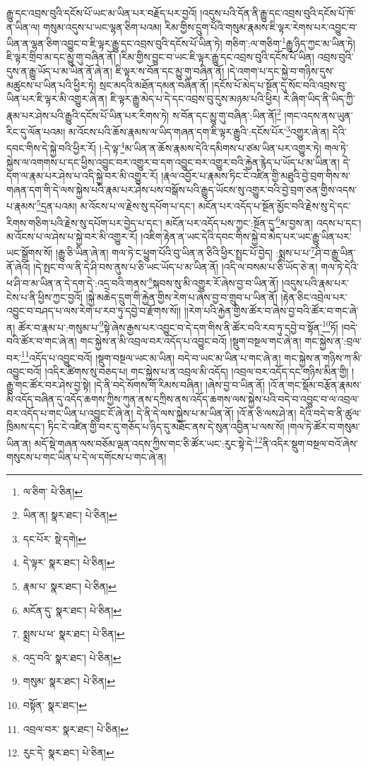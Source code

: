 རྒྱུ་དང་འབྲས་བུའི་དངོས་པོ་ཡང་མ་ཡིན་པར་བརྗོད་པར་བྱའོ། །འདུས་པའི་དོན་ནི་རྒྱུ་དང་འབྲས་བུའི་དངོས་པོ་ཁོ་ན་ཡིན་ལ། གསུམ་འདུས་པ་ཡང་ལྷན་ཅིག་པའམ། རིམ་གྱིས་དྲུག་པོའི་གསུམ་རྣམས་ཇི་ལྟར་རེགས་པར་འབྱུང་བ་ཡིན་ན་ལྷན་ཅིག་འབྱུང་བ་ཇི་ལྟར་རྒྱུ་དང་འབྲས་བུའི་དངོས་པོ་ཡིན་ཏེ། གཅིག་:ལ་གཅིག་\footnote{ལ་ཅིག་  པེ་ཅིན། }རྒྱུ་ཉིད་ཀྱང་མ་ཡིན་ཏེ། ཇི་ལྟར་གྲིབ་མ་དང་མྱུ་གུ་བཞིན་ནོ། །རིམ་གྱིས་བྱུང་བ་ཡང་ཇི་ལྟར་རྒྱུ་དང་འབྲས་བུའི་དངོས་པོ་ཡིན། འབྲས་བུའི་དུས་ན་རྒྱུ་ཡོད་པ་མ་ཡིན་ནོ་ཞེ་ན། ཇི་ལྟར་ས་བོན་དང་མྱུ་གུ་བཞིན་ནོ། །དེ་འགག་པ་དང་སྐྱེ་བ་གཉིས་དུས་མཚུངས་པ་ཡིན་པའི་ཕྱིར་ཏེ། སྲང་མདའི་མཐོན་དམན་བཞིན་ནོ། །དངོས་པོ་མེད་པ་སྔོན་དུ་སོང་བའི་འབྲས་བུ་ཡིན་པར་ཇི་ལྟར་མི་འགྱུར་ཞེ་ན། ཇི་ལྟར་རྒྱུ་མེད་པ་དེ་དང་འབྲས་བུ་དུས་མཉམ་པའི་ཕྱིར། རེ་ཞིག་ཡིད་ནི་ཡིད་ཀྱི་རྣམ་པར་ཤེས་པའི་རྒྱུའི་དངོས་པོ་ཡིན་པར་རིགས་ཏེ། ས་བོན་དང་མྱུ་གུ་བཞིན་:ཡིན་ནོ།\footnote{ཡིན་ན།  སྣར་ཐང་།  པེ་ཅིན། } །གང་འདས་ནས་ཡུན་རིང་དུ་ལོན་པའམ། མ་འོངས་པའི་ཆོས་རྣམས་ལ་ཡིད་གཞན་དག་ཇི་ལྟར་རྒྱུའི་:དངོས་པོར་\footnote{དང་པོར་  སྡེ་དགེ། }འགྱུར་ཞེ་ན། དེའི་དབང་གིས་དེ་སྐྱེ་བའི་ཕྱིར་རོ། །:དེ་ལྟ་\footnote{དེ་ལྟར་  སྣར་ཐང་།  པེ་ཅིན། }མ་ཡིན་ན་ཆོས་རྣམས་དེའི་དམིགས་པ་ཙམ་ཡིན་པར་འགྱུར་ཏེ། གལ་ཏེ་སྐྱེས་ལ་འགགས་པ་དང་ཕྱིས་འབྱུང་བར་འགྱུར་བ་དག་འབྱུང་བར་འགྱུར་བའི་རྐྱེན་རྙེད་པ་ཡོད་པ་མ་ཡིན་ན། དེ་དག་ལ་རྣམ་པར་ཤེས་པ་འདི་སྐྱེ་བར་མི་འགྱུར་རོ། །རྣལ་འབྱོར་པ་རྣམས་ཏིང་ངེ་འཛིན་གྱི་མཐུའི་བྱེ་བྲག་གིས་ས་གཞན་དག་གི་དེ་ལས་སྐྱེས་པའི་རྣམ་པར་ཤེས་པས་བསྒོས་པའི་རྒྱུད་ཡོངས་སུ་འགྱུར་བའི་བྱེ་བྲག་ཅན་གྱིས་འདས་པ་རྣམས་\footnote{རྣམ་པ་  སྣར་ཐང་།  པེ་ཅིན། }དྲན་པའམ། མ་འོངས་པ་ལ་རྗེས་སུ་དཔོག་པ་དང་། མངོན་པར་འདོད་པ་སྔོན་མྱོང་བའི་རྗེས་སུ་དེ་དང་རིགས་གཅིག་པའི་རྗེས་སུ་དཔོག་པར་བྱེད་པ་དང་། མངོན་པར་འདོད་པས་ཀྱང་:སྔོན་དུ་\footnote{མངོན་དུ་  སྣར་ཐང་།  པེ་ཅིན། }མ་བྱས་ན། འདས་པ་དང་། མ་འོངས་པ་ལ་ཤེས་པ་སྐྱེ་བར་མི་འགྱུར་རོ། །འཇིག་རྟེན་ན་ཡང་དེའི་དབང་གིས་སྐྱེ་བ་མེད་པར་ཡང་རྒྱུ་ཡིན་པར་ཡང་སྒྲོགས་སོ། །རྒྱུ་ཅི་ཡིན་ཞེ་ན། གལ་ཏེ་ང་ཕྱུག་པོའི་བུ་ཡིན་ན་ཅིའི་ཕྱིར་སྤྲང་པོ་བྱེད། :སྨྲས་པ་པ་\footnote{སྨྲས་པ་ཕ་  སྣར་ཐང་།  པེ་ཅིན། }ཤི་བ་རྒྱུ་ཡིན་ནོ་ཞེའོ། །དེ་སྤང་བ་ལ་ནི་དེ་ཤི་བས་ནུས་པ་ཅི་ཡང་ཡོད་པ་མ་ཡིན་ནོ། །འདི་ལ་བསམ་པ་ཅི་ཡོད་ཅེ་ན། གལ་ཏེ་དེའི་ཕ་ཤི་བ་མ་ཡིན་ན་དེ་དག་དེ་:འདྲ་བའི་གནས་\footnote{འདྲ་བའི་  སྣར་ཐང་།  པེ་ཅིན། }སྐབས་སུ་མི་འགྱུར་རོ་ཞེས་བྱ་བ་ཡིན་ནོ། །འདུས་པའི་རྣམ་པར་ངེས་པ་ནི་ཕྱིས་ཀྱང་བྱའོ། །སྐྱེ་མཆེད་དྲུག་གི་རྐྱེན་གྱིས་རེག་པ་ཞེས་བྱ་བ་གྲུབ་པ་ཡིན་ནོ། །རྟེན་ཅིང་འབྲེལ་པར་འབྱུང་བ་བཤད་པ་ལས་རེག་པ་རབ་ཏུ་དབྱེ་བ་རྫོགས་སོ།། །།རེག་པའི་རྐྱེན་གྱིས་ཚོར་བ་ཞེས་བྱ་བའི་ཚོར་བ་གང་ཞེ་ན། ཚོར་བ་རྣམ་པ་:གསུམ་པ་\footnote{གསུམ་  སྣར་ཐང་།  པེ་ཅིན། }སྟེ་ཞེས་རྒྱས་པར་འབྱུང་བ་དེ་དག་གིས་ནི་ཚོར་བའི་རབ་ཏུ་དབྱེ་བ་སྟོན་\footnote{བསྟོན་  སྣར་ཐང་། }ཏོ། །བདེ་བའི་ཚོར་བ་གང་ཞེ་ན། གང་སྐྱེས་ན་མི་འབྲལ་བར་འདོད་པ་འབྱུང་བའོ། །སྡུག་བསྔལ་གང་ཞེ་ན། གང་སྐྱེས་ན་:བྲལ་བར་\footnote{འབྲལ་བར་  སྣར་ཐང་།  པེ་ཅིན། }འདོད་པ་འབྱུང་བའོ། །སྡུག་བསྔལ་ཡང་མ་ཡིན། བདེ་བ་ཡང་མ་ཡིན་པ་གང་ཞེ་ན། གང་སྐྱེས་ན་གཉིས་ཀ་མི་འབྱུང་བའོ། །འདིར་ཚིགས་སུ་བཅད་པ། གང་སྐྱེས་པ་ན་འབྲལ་མི་འདོད། །འབྲལ་བར་འདོད་དང་གཉིས་མིན་གྱི། །རྒྱུ་གང་ཚོར་བར་ཤེས་བྱ་སྟེ། །དེ་ནི་བདེ་སོགས་གོ་རིམས་བཞིན། །ཞེས་བྱ་བ་ཡིན་ནོ། །འོ་ན་གང་སྡོམ་བརྩོན་རྣམས་མི་འདོད་བཞིན་དུ་འདོད་ཆགས་ཀྱིས་ཀུན་ནས་དཀྲིས་ནས་འདོད་ཆགས་ལས་སྐྱེས་པའི་བདེ་བ་འབྱུང་བ་ལ་འབྲལ་བར་འདོད་པ་གང་ཡིན་པ་འབྱུང་ངོ་ཞེ་ན། དེ་ནི་དེ་ལས་སྐྱེས་པ་མ་ཡིན་ནོ། །འོ་ན་ཅི་ལས་ཤེ་ན། དེའི་བདེ་བ་ནི་ཚུལ་ཁྲིམས་དང་། ཏིང་ངེ་འཛིན་གྱི་བར་དུ་གཅོད་པ་ཉིད་དུ་མཐོང་ནས་དེ་སུན་འབྱིན་པ་ལས་སོ། །གལ་ཏེ་ཚོར་བ་གསུམ་ཡིན་ན། མདོ་སྡེ་གཞན་ལས་བཅོམ་ལྡན་འདས་ཀྱིས་གང་ཅི་ཚོར་ཡང་:རུང་སྟེ་དེ་\footnote{རུང་དེ་  སྣར་ཐང་།  པེ་ཅིན། }ནི་འདིར་སྡུག་བསྔལ་བའོ་ཞེས་གསུངས་པ་གང་ཡིན་པ་དེ་ལ་དགོངས་པ་གང་ཞེ་ན། 